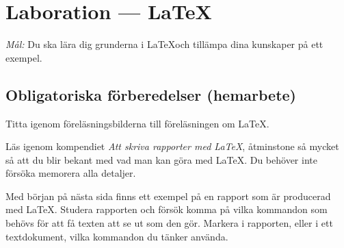 \section{Laboration  --- \LaTeX}

\emph{Mål:} Du ska lära dig grunderna i \LaTeX och tillämpa dina kunskaper på ett exempel.


\subsection*{Obligatoriska förberedelser (hemarbete)}
\begin{Hemarbete}\firmlist
	\item Titta igenom föreläsningsbilderna till föreläsningen om \LaTeX.
	\item Läs igenom kompendiet \emph{Att skriva rapporter med \LaTeX}, åtminstone så mycket så att du blir bekant med vad man kan göra med \LaTeX. Du behöver inte försöka memorera alla detaljer.
	\item \label{hem:latexuppg} Med början på nästa sida finns ett exempel på en rapport som är producerad med \LaTeX. Studera rapporten och försök komma på vilka kommandon som behövs för att få texten att se ut som den gör. Markera i rapporten, eller i ett textdokument, vilka kommandon du tänker använda.
\end{Hemarbete}

